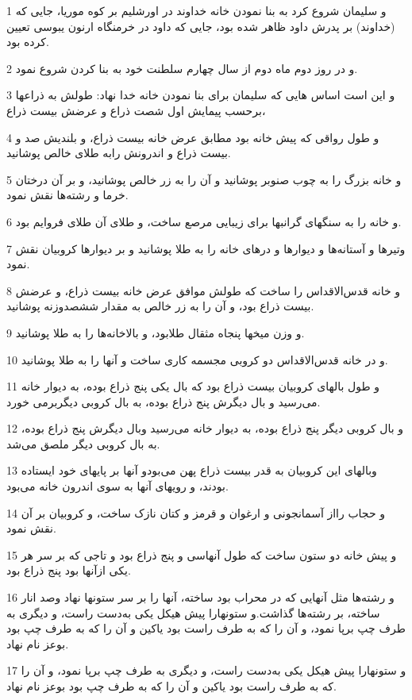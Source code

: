 \par 1 و سلیمان شروع کرد به بنا نمودن خانه خداوند در اورشلیم بر کوه موریا، جایی که (خداوند) بر پدرش داود ظاهر شده بود، جایی که داود در خرمنگاه ارنون یبوسی تعیین کرده بود.
\par 2 و در روز دوم ماه دوم از سال چهارم سلطنت خود به بنا کردن شروع نمود.
\par 3 و این است اساس هایی که سلیمان برای بنا نمودن خانه خدا نهاد: طولش به ذراعها برحسب پیمایش اول شصت ذراع و عرضش بیست ذراع،
\par 4 و طول رواقی که پیش خانه بود مطابق عرض خانه بیست ذراع، و بلندیش صد و بیست ذراع و اندرونش رابه طلای خالص پوشانید.
\par 5 و خانه بزرگ را به چوب صنوبر پوشانید و آن را به زر خالص پوشانید، و بر آن درختان خرما و رشته‌ها نقش نمود.
\par 6 و خانه را به سنگهای گرانبها برای زیبایی مرصع ساخت، و طلای آن طلای فروایم بود.
\par 7 وتیرها و آستانه‌ها و دیوارها و درهای خانه را به طلا پوشانید و بر دیوارها کروبیان نقش نمود.
\par 8 و خانه قدس‌الاقداس را ساخت که طولش موافق عرض خانه بیست ذراع، و عرضش بیست ذراع بود، و آن را به زر خالص به مقدار ششصدوزنه پوشانید.
\par 9 و وزن میخها پنجاه مثقال طلابود، و بالاخانه‌ها را به طلا پوشانید.
\par 10 و در خانه قدس‌الاقداس دو کروبی مجسمه کاری ساخت و آنها را به طلا پوشانید.
\par 11 و طول بالهای کروبیان بیست ذراع بود که بال یکی پنج ذراع بوده، به دیوار خانه می‌رسید و بال دیگرش پنج ذراع بوده، به بال کروبی دیگربرمی خورد.
\par 12 و بال کروبی دیگر پنج ذراع بوده، به دیوار خانه می‌رسید وبال دیگرش پنج ذراع بوده، به بال کروبی دیگر ملصق می‌شد.
\par 13 وبالهای این کروبیان به قدر بیست ذراع پهن می‌بودو آنها بر پایهای خود ایستاده بودند، و رویهای آنها به سوی اندرون خانه می‌بود.
\par 14 و حجاب رااز آسمانجونی و ارغوان و قرمز و کتان نازک ساخت، و کروبیان بر آن نقش نمود.
\par 15 و پیش خانه دو ستون ساخت که طول آنهاسی و پنج ذراع بود و تاجی که بر سر هر یکی ازآنها بود پنج ذراع بود.
\par 16 و رشته‌ها مثل آنهایی که در محراب بود ساخته، آنها را بر سر ستونها نهاد وصد انار ساخته، بر رشته‌ها گذاشت.و ستونهارا پیش هیکل یکی به‌دست راست، و دیگری به طرف چپ برپا نمود، و آن را که به طرف راست بود یاکین و آن را که به طرف چپ بود بوعز نام نهاد.
\par 17 و ستونهارا پیش هیکل یکی به‌دست راست، و دیگری به طرف چپ برپا نمود، و آن را که به طرف راست بود یاکین و آن را که به طرف چپ بود بوعز نام نهاد.
 

